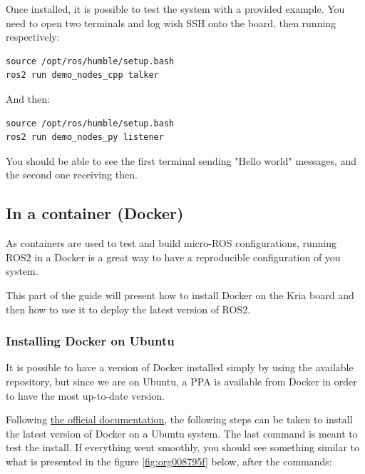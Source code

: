 \documentclass[10pt]{article}
\begin{document}
Once installed, it is possible to test the system with a provided example.
You need to open two terminals and log wish SSH onto the board, then running
respectively:
\begin{verbatim}
source /opt/ros/humble/setup.bash
ros2 run demo_nodes_cpp talker
\end{verbatim}

And then:
\begin{verbatim}
source /opt/ros/humble/setup.bash
ros2 run demo_nodes_py listener
\end{verbatim}

You should be able to see the first terminal sending "Hello world" messages,
and the second one receiving then.

\subsection{In a container (Docker)}
\label{sec:orgd77d4c0}
As containers are used to test and build micro-ROS configurations,
running ROS2 in a Docker  is a great way to have a reproducible configuration
of you system.

This part of the guide will present how to install Docker on the
Kria board and then how to use it to deploy the latest version of ROS2.

\subsubsection{Installing Docker on Ubuntu}
\label{sec:orgfb922a2}
It is possible to have a version of Docker installed simply by using the available repository,
but since we are on Ubuntu, a PPA is available from Docker in order to have the most up-to-date version.

Following \href{https://docs.docker.com/engine/install/ubuntu/\#install-using-the-repository}{the official documentation}, the following steps can be taken to install the latest version of
Docker on a Ubuntu system. The last command is meant to test the install.
If everything went smoothly, you should see something similar to what is presented
in the figure \ref{fig:org008795f} below, after the commands:
\end{document}
